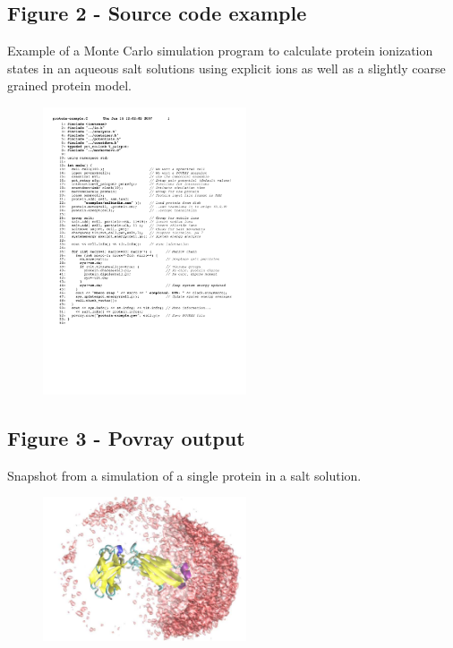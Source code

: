 \documentclass[10pt]{bmc_article}
\newenvironment{bmcformat}{\fussy\setboolean{publ}{true}}{\fussy}
\begin{document}
\begin{bmcformat}
  \subsection*{Figure 2 - Source code example}
      Example of a Monte Carlo simulation program to calculate protein
      ionization states in an aqueous salt solutions using explicit ions as well as
      a slightly coarse grained protein model.
      \begin{figure}[ht]\center
      \includegraphics[width=6cm]{pics/source}
      \end{figure}
      
  \subsection*{Figure 3 - Povray output}
     Snapshot from a simulation of a single protein in a salt solution.
     \begin{figure}[ht]\center
      \includegraphics[width=6cm]{pics/snapshot}
      \end{figure}

\end{bmcformat}
\end{document}
